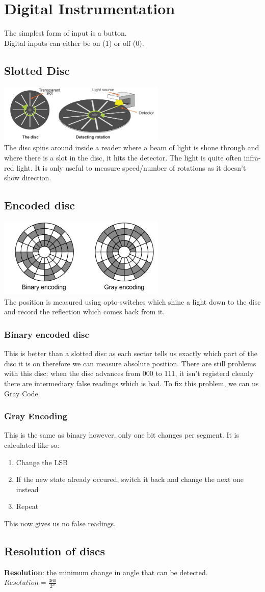 \documentclass[a4paper, 11pt, twocolumn]{article}
\begin{document}
    \section{Digital Instrumentation}
    The simplest form of input is a button. \\
    Digital inputs can either be on (1) or off (0).
    \subsection{Slotted Disc}
    \includegraphics[width=8cm]{slottedDisk.jpg} \\
    The disc spins around inside a reader where a beam of light is shone through and where there is a slot in the disc, it hits the detector. The light is quite often infra-red light. It is only useful to measure speed/number of rotations as it doesn't show direction.
    \subsection{Encoded disc}
    \includegraphics[width=8cm]{encodedDisk.jpg} \\
    The position is measured using opto-switches which shine a light down to the disc and record the reflection which comes back from it.
    \subsubsection{Binary encoded disc}
    This is better than a slotted disc as each sector tells us exactly which part of the disc it is on therefore we can measure absolute position.
    There are still problems with this disc: when the disc advances from 000 to 111, it isn't registerd cleanly there are intermediary false readings which is bad. To fix this problem, we can us Gray Code.
    \subsubsection{Gray Encoding}
    This is the same as binary however, only one bit changes per segment. It is calculated like so:
    \begin{enumerate}
        \item Change the LSB
        \item If the new state already occured, switch it back and change the next one instead
        \item Repeat
    \end{enumerate}
    This now gives us no false readings.
    \subsection{Resolution of discs}
    \textbf{Resolution}: the minimum change in angle that can be detected.\\
    $Resolution = \frac{360}{2^n}$
\end{document}
